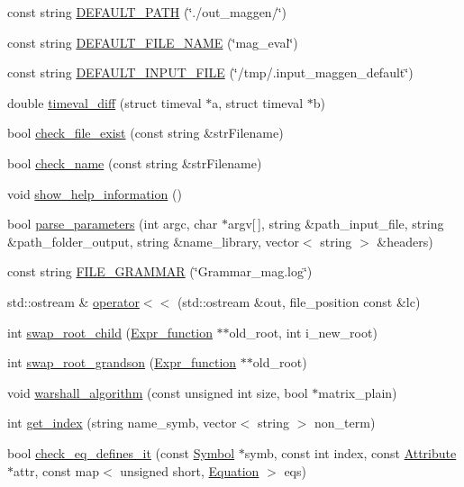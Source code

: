 \begin{CompactItemize}
\item 
const string \hyperlink{namespacegenevalmag_7bb640f537df129ffe4ed8cc5f703d90}{DEFAULT\_\-PATH} (\char`\"{}./out\_\-maggen/\char`\"{})
\item 
const string \hyperlink{namespacegenevalmag_a939bb88a9eee5dd79de6b2c0d9dc27b}{DEFAULT\_\-FILE\_\-NAME} (\char`\"{}mag\_\-eval\char`\"{})
\item 
const string \hyperlink{namespacegenevalmag_c01c19863afca7ad5f021857f24032c3}{DEFAULT\_\-INPUT\_\-FILE} (\char`\"{}/tmp/.input\_\-maggen\_\-default\char`\"{})
\item 
double \hyperlink{namespacegenevalmag_885d7859db4dd91f78bb7081be6ceacb}{timeval\_\-diff} (struct timeval $\ast$a, struct timeval $\ast$b)
\item 
bool \hyperlink{namespacegenevalmag_8d54caf5e5830cd48bf3265345928c3a}{check\_\-file\_\-exist} (const string \&strFilename)
\item 
bool \hyperlink{namespacegenevalmag_3bc888ab3b44c41a536427cf386f8c3d}{check\_\-name} (const string \&strFilename)
\item 
void \hyperlink{namespacegenevalmag_fe9d3ca44e4de7e9ebe9f47a62ed7aa5}{show\_\-help\_\-information} ()
\item 
bool \hyperlink{namespacegenevalmag_d3dcc8f1c112c2fee686c837e5250124}{parse\_\-parameters} (int argc, char $\ast$argv\mbox{[}$\,$\mbox{]}, string \&path\_\-input\_\-file, string \&path\_\-folder\_\-output, string \&name\_\-library, vector$<$ string $>$ \&headers)
\item 
const string \hyperlink{namespacegenevalmag_dd88c73415b1eb5c506b9d66b294b7cf}{FILE\_\-GRAMMAR} (\char`\"{}Grammar\_\-mag.log\char`\"{})
\item 
std::ostream \& \hyperlink{namespacegenevalmag_4093becff20c4564db790c08c1189aaf}{operator$<$$<$} (std::ostream \&out, file\_\-position const \&lc)
\item 
int \hyperlink{namespacegenevalmag_5132358a5088f64e976aa18643cff4d8}{swap\_\-root\_\-child} (\hyperlink{classgenevalmag_1_1Expr__function}{Expr\_\-function} $\ast$$\ast$old\_\-root, int i\_\-new\_\-root)
\item 
int \hyperlink{namespacegenevalmag_18228f21bca4decde649041801026a35}{swap\_\-root\_\-grandson} (\hyperlink{classgenevalmag_1_1Expr__function}{Expr\_\-function} $\ast$$\ast$old\_\-root)
\item 
void \hyperlink{namespacegenevalmag_311f0385029ff37574bbf0189064f310}{warshall\_\-algorithm} (const unsigned int size, bool $\ast$matrix\_\-plain)
\item 
int \hyperlink{namespacegenevalmag_6442b82b3f1265663c5bdb2bc80f4421}{get\_\-index} (string name\_\-symb, vector$<$ string $>$ non\_\-term)
\item 
bool \hyperlink{namespacegenevalmag_d0ec9b7706a340d2e674f3b4859afa2d}{check\_\-eq\_\-defines\_\-it} (const \hyperlink{classgenevalmag_1_1Symbol}{Symbol} $\ast$symb, const int index, const \hyperlink{classgenevalmag_1_1Attribute}{Attribute} $\ast$attr, const map$<$ unsigned short, \hyperlink{classgenevalmag_1_1Equation}{Equation} $>$ eqs)
\end{CompactItemize}
